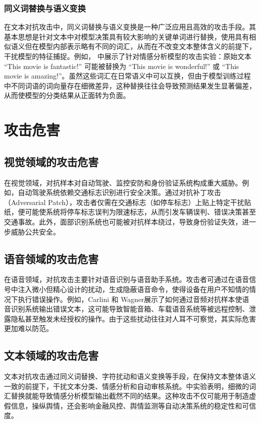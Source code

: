 \documentclass[main]{IEEEtran}
\begin{document}
\subsubsection{同义词替换与语义变换}
在文本对抗攻击中，同义词替换与语义变换是一种广泛应用且高效的攻击手段。其基本思想是针对文本中对模型决策具有较大影响的关键单词进行替换，使用具有相似语义但在模型内部表示略有不同的词汇，从而在不改变文本整体含义的前提下，干扰模型的特征捕捉。例如，\cite{li2019textbugger} 中展示了针对情感分析模型的攻击实验：原始文本 “This movie is fantastic!” 可能被替换为 “This movie is wonderful!” 或 “This movie is amazing!”。虽然这些词汇在日常语义中可以互换，但由于模型训练过程中不同词语的词向量存在细微差异，这种替换往往会导致预测结果发生显著偏差，从而使模型的分类结果从正面转为负面。

\section{攻击危害}
\songti
\subsection{视觉领域的攻击危害}
在视觉领域，对抗样本对自动驾驶、监控安防和身份验证系统构成重大威胁。例如，自动驾驶系统依赖交通标志识别进行安全决策。通过对抗补丁攻击（Adversarial Patch），攻击者仅需在交通标志（如停车标志）上贴上特定干扰贴纸，便可能使系统将停车标志误判为限速标志，从而引发车辆误判、错误决策甚至交通事故\cite{brown2017adversarial, kurakin2018adversarial}。此外，面部识别系统也可能被对抗样本绕过，导致身份验证失效，进一步威胁公共安全\cite{sharif2016accessorize}。
\subsection{语音领域的攻击危害}
在语音领域，对抗攻击主要针对语音识别与语音助手系统。攻击者可通过在语音信号中注入微小但精心设计的扰动，生成隐蔽语音命令，使得设备在用户不知情的情况下执行错误操作。例如，Carlini 和 Wagner\cite{carlini2018audio}展示了如何通过音频对抗样本使语音识别系统输出错误文本，这可能导致智能音箱、车载语音系统等被远程控制、泄露隐私甚至触发未经授权的操作。由于这些扰动往往对人耳不可察觉，其实际危害更加难以防范。
\subsection{文本领域的攻击危害}
文本对抗攻击通过同义词替换、字符扰动和语义变换等手段，在保持文本整体语义一致的前提下，干扰文本分类、情感分析和自动审核系统。\cite{li2019textbugger}中实验表明，细微的词汇替换就能导致情感分析模型输出截然不同的结果。这种攻击不仅可能用于制造虚假信息，操纵舆情，还会影响金融风控、舆情监测等自动决策系统的稳定性和可信度。
\end{document}
